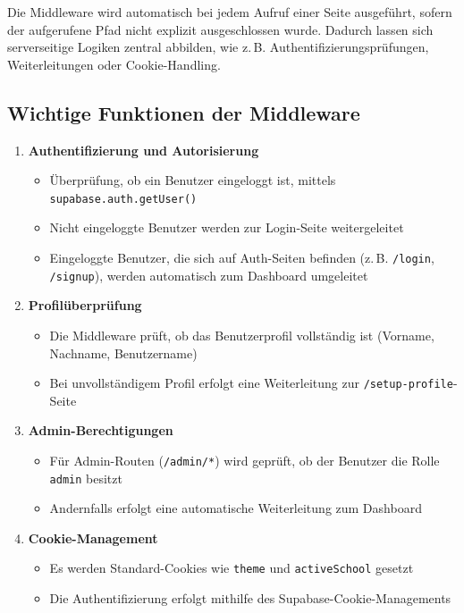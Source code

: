 \begin{inhalt}
Die Middleware wird automatisch bei jedem Aufruf einer Seite ausgeführt, sofern der aufgerufene Pfad nicht explizit ausgeschlossen wurde.  
Dadurch lassen sich serverseitige Logiken zentral abbilden, wie z.\,B. Authentifizierungsprüfungen, Weiterleitungen oder Cookie-Handling.

\subsection*{Wichtige Funktionen der Middleware}

\begin{enumerate}[label=\textbf{\arabic*.}]
  \item \textbf{Authentifizierung und Autorisierung}
  \begin{itemize}
    \item Überprüfung, ob ein Benutzer eingeloggt ist, mittels \texttt{supabase.auth.getUser()}
    \item Nicht eingeloggte Benutzer werden zur Login-Seite weitergeleitet
    \item Eingeloggte Benutzer, die sich auf Auth-Seiten befinden (z.\,B. \texttt{/login}, \texttt{/signup}), werden automatisch zum Dashboard umgeleitet
  \end{itemize}

  \item \textbf{Profilüberprüfung}
  \begin{itemize}
    \item Die Middleware prüft, ob das Benutzerprofil vollständig ist (Vorname, Nachname, Benutzername)
    \item Bei unvollständigem Profil erfolgt eine Weiterleitung zur \texttt{/setup-profile}-Seite
  \end{itemize}

  \item \textbf{Admin-Berechtigungen}
  \begin{itemize}
    \item Für Admin-Routen (\texttt{/admin/*}) wird geprüft, ob der Benutzer die Rolle \texttt{admin} besitzt
    \item Andernfalls erfolgt eine automatische Weiterleitung zum Dashboard
  \end{itemize}

  \item \textbf{Cookie-Management}
  \begin{itemize}
    \item Es werden Standard-Cookies wie \texttt{theme} und \texttt{activeSchool} gesetzt
    \item Die Authentifizierung erfolgt mithilfe des Supabase-Cookie-Managements
  \end{itemize}


\end{enumerate}
\end{inhalt}
